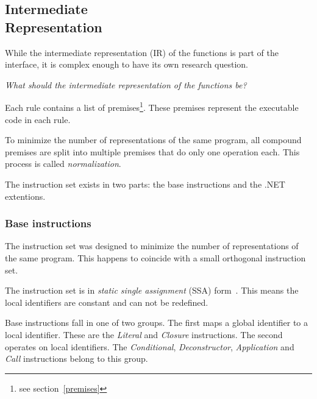 \subsection[Intermediate Representation]{Intermediate\\Representation}\label{ir}
While the intermediate representation (IR) of the functions is part of the interface, it is complex enough to have its own research question.

\textit{What should the intermediate representation of the functions be?}

Each rule contains a list of premises\footnote{see section~\ref{premises}}.
These premises represent the executable code in each rule.

To minimize the number of representations of the same program, all compound premises are split into multiple premises that do only one operation each.
This process is called \textit{normalization}\label{normalization}.

The instruction set exists in two parts: the base instructions and the .NET extentions.

\subsubsection{Base instructions}
The instruction set was designed to minimize the number of representations of the same program.
This happens to coincide with a small orthogonal instruction set.

The instruction set is in \textit{static single assignment} (SSA) form~\cite{leestatic}.
This means the local identifiers are constant and can not be redefined.

Base instructions fall in one of two groups.
The first maps a global identifier to a local identifier.
These are the \textit{Literal} and \textit{Closure} instructions.
The second operates on local identifiers.
The \textit{Conditional}, \textit{Deconstructor}, \textit{Application} and \textit{Call} instructions belong to this group.

